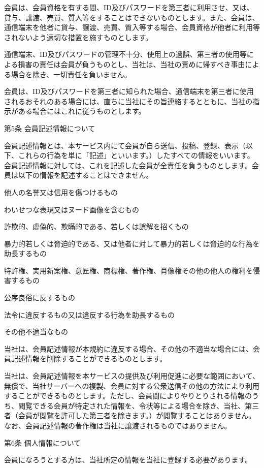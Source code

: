     会員は、会員資格を有する間、ID及びパスワードを第三者に利用させ、又は、貸与、譲渡、売買、質入等をすることはできないものとします。また、会員は、通信端末を他者に貸与、譲渡、売買、質入等する場合、会員資格が他者に利用等されないよう適切な措置を施すものとします。

    通信端末、ID及びパスワードの管理不十分、使用上の過誤、第三者の使用等による損害の責任は会員が負うものとし、当社は、当社の責めに帰すべき事由による場合を除き、一切責任を負いません。

    会員は、ID及びパスワードを第三者に知られた場合、通信端末を第三者に使用されるおそれのある場合には、直ちに当社にその旨連絡するとともに、当社の指示がある場合にはこれに従うものとします。

第5条 会員記述情報について

    会員記述情報とは、本サービス内にて会員が自ら送信、投稿、登録、表示（以下、これらの行為を単に「記述」といいます。）したすべての情報をいいます。会員記述情報に対しては、これを記述した会員が全責任を負うものとします。会員は以下の情報を記述することはできません。

        他人の名誉又は信用を傷つけるもの

        わいせつな表現又はヌード画像を含むもの

        詐欺的、虚偽的、欺瞞的である、若しくは誤解を招くもの

        暴力的若しくは脅迫的である、又は他者に対して暴力的若しくは脅迫的な行為を助長するもの

        特許権、実用新案権、意匠権、商標権、著作権、肖像権その他の他人の権利を侵害するもの

        公序良俗に反するもの

        法令に違反するもの又は違反する行為を助長するもの

        その他不適当なもの

    当社は、会員記述情報が本規約に違反する場合、その他の不適当な場合には、会員記述情報を削除することができるものとします。

    当社は、会員記述情報を本サービスの提供及び利用促進に必要な範囲において、無償で、当社サーバーへの複製、会員に対する公衆送信その他の方法により利用することができるものとします。ただし、会員間によりやりとりされる情報のうち、閲覧できる会員が特定された情報を、令状等による場合を除き、当社、第三者（会員が閲覧を許可した第三者を除きます。）が閲覧することはありません。なお、会員記述情報の著作権は当社に譲渡されるものではありません。

第6条 個人情報について

    会員になろうとする方は、当社所定の情報を当社に登録する必要があります。

